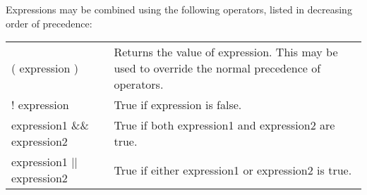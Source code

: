 \documentclass[11pt]{article}
\begin{document}
Expressions may be combined using the following operators, listed in decreasing order of precedence:

\begin{longtable}{p{}p{}}
( expression ) &
Returns the value of expression. This may be used to override the normal precedence of operators. \\

! expression &
True if expression is false. \\

expression1 \&\& expression2 &
True if both expression1 and expression2 are true. \\

expression1 || expression2 &
True if either expression1 or expression2 is true. \\
\end{longtable}
\end{document}

